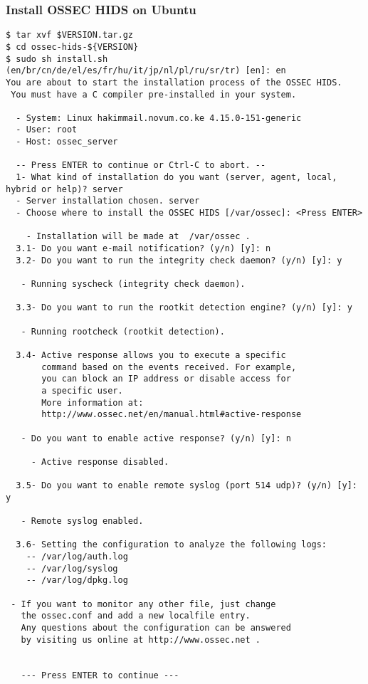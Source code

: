 \documentclass{article}
\begin{document}
\subsubsection{Install OSSEC HIDS on Ubuntu}
\begin{verbatim}
$ tar xvf $VERSION.tar.gz
$ cd ossec-hids-${VERSION}
$ sudo sh install.sh
(en/br/cn/de/el/es/fr/hu/it/jp/nl/pl/ru/sr/tr) [en]: en
You are about to start the installation process of the OSSEC HIDS.
 You must have a C compiler pre-installed in your system.

  - System: Linux hakimmail.novum.co.ke 4.15.0-151-generic
  - User: root
  - Host: ossec_server

  -- Press ENTER to continue or Ctrl-C to abort. --
  1- What kind of installation do you want (server, agent, local, hybrid or help)? server
  - Server installation chosen. server
  - Choose where to install the OSSEC HIDS [/var/ossec]: <Press ENTER>

    - Installation will be made at  /var/ossec .
  3.1- Do you want e-mail notification? (y/n) [y]: n
  3.2- Do you want to run the integrity check daemon? (y/n) [y]: y

   - Running syscheck (integrity check daemon).

  3.3- Do you want to run the rootkit detection engine? (y/n) [y]: y

   - Running rootcheck (rootkit detection).

  3.4- Active response allows you to execute a specific
       command based on the events received. For example,
       you can block an IP address or disable access for
       a specific user.
       More information at:
       http://www.ossec.net/en/manual.html#active-response

   - Do you want to enable active response? (y/n) [y]: n

     - Active response disabled.

  3.5- Do you want to enable remote syslog (port 514 udp)? (y/n) [y]: y

   - Remote syslog enabled.

  3.6- Setting the configuration to analyze the following logs:
    -- /var/log/auth.log
    -- /var/log/syslog
    -- /var/log/dpkg.log

 - If you want to monitor any other file, just change
   the ossec.conf and add a new localfile entry.
   Any questions about the configuration can be answered
   by visiting us online at http://www.ossec.net .


   --- Press ENTER to continue ---
\end{verbatim}
\end{document}
